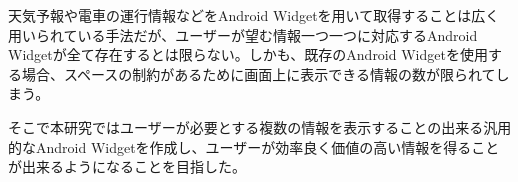 
\begin{jabstract}
天気予報や電車の運行情報などをAndroid Widgetを用いて取得することは広く用いられている手法だが、ユーザーが望む情報一つ一つに対応するAndroid Widgetが全て存在するとは限らない。しかも、既存のAndroid Widgetを使用する場合、スペースの制約があるために画面上に表示できる情報の数が限られてしまう。

そこで本研究ではユーザーが必要とする複数の情報を表示することの出来る汎用的なAndroid Widgetを作成し、ユーザーが効率良く価値の高い情報を得ることが出来るようになることを目指した。

\end{jabstract}
